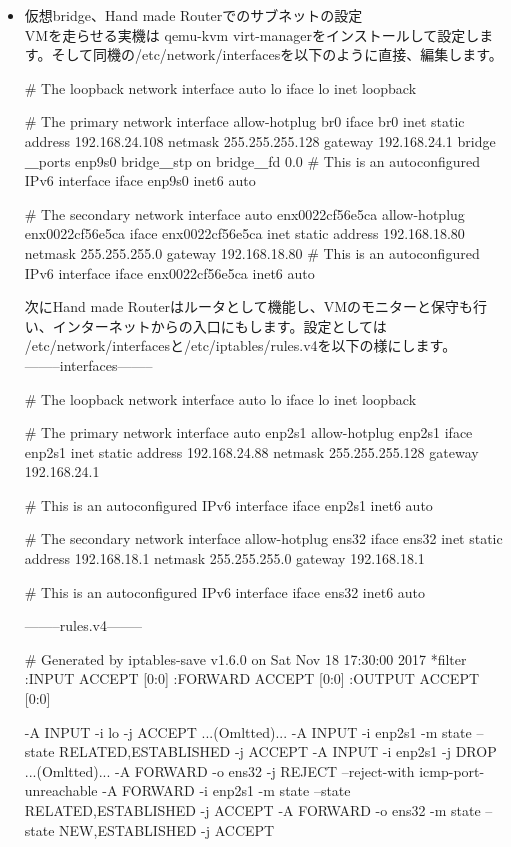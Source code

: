 \documentclass[mingoth,a4paper]{jsarticle}
\begin{document}
\begin{itemize}
\item 仮想bridge、Hand made Routerでのサブネットの設定\\
VMを走らせる実機は qemu-kvm virt-managerをインストールして設定します。そして同機の/etc/network/interfacesを以下のように直接、編集します。
\begin{commandline}
# The loopback network interface
auto lo
iface lo inet loopback

# The primary network interface
allow-hotplug br0
iface br0 inet static
   address 192.168.24.108
   netmask 255.255.255.128
   gateway 192.168.24.1
   bridge＿ports enp9s0
   bridge＿stp on
   bridge＿fd 0.0
# This is an autoconfigured IPv6 interface
iface enp9s0 inet6 auto

# The secondary network interface
auto enx0022cf56e5ca
allow-hotplug enx0022cf56e5ca
iface enx0022cf56e5ca inet static
address 192.168.18.80
netmask 255.255.255.0
gateway 192.168.18.80
# This is an autoconfigured IPv6 interface
iface enx0022cf56e5ca inet6 auto
\end{commandline}
次にHand made Routerはルータとして機能し、VMのモニターと保守も行い、インターネットからの入口にもします。設定としては /etc/network/interfacesと/etc/iptables/rules.v4を以下の様にします。\\
--------interfaces--------
\begin{commandline}
# The loopback network interface
auto lo
iface lo inet loopback

# The primary network interface
auto enp2s1
allow-hotplug enp2s1
iface enp2s1 inet static
address 192.168.24.88
netmask 255.255.255.128
gateway 192.168.24.1

# This is an autoconfigured IPv6 interface
iface enp2s1 inet6 auto

# The secondary network interface
allow-hotplug ens32
iface ens32 inet static
address 192.168.18.1
netmask 255.255.255.0
gateway 192.168.18.1

# This is an autoconfigured IPv6 interface
iface ens32 inet6 auto
\end{commandline}
\clearpage
--------rules.v4--------
\begin{commandline}
# Generated by iptables-save v1.6.0 on Sat Nov 18 17:30:00 2017
*filter
:INPUT ACCEPT [0:0]
:FORWARD ACCEPT [0:0]
:OUTPUT ACCEPT [0:0]

-A INPUT -i lo -j ACCEPT
...(Omltted)...
-A INPUT -i enp2s1 -m state --state RELATED,ESTABLISHED -j ACCEPT
-A INPUT -i enp2s1 -j DROP
...(Omltted)...
-A FORWARD -o ens32 -j REJECT --reject-with icmp-port-unreachable
-A FORWARD -i enp2s1 -m state --state RELATED,ESTABLISHED -j ACCEPT
-A FORWARD -o ens32 -m state --state NEW,ESTABLISHED -j ACCEPT


\end{commandline}
\end{itemize}
\end{document}
